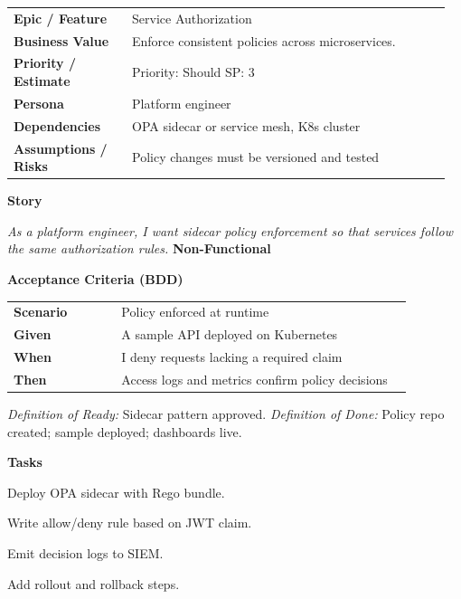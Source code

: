 \documentclass[11pt,letterpaper]{article}
\makeatletter
\newenvironment{kvtable}{%
  \begin{tabular}{@{}>{\bfseries\arraybackslash}p{0.26\linewidth} p{0.70\linewidth}@{}}
}{\end{tabular}}
\newenvironment{bdd}{%
  \begin{tabular}{@{}>{\bfseries\arraybackslash}p{0.26\linewidth} p{0.70\linewidth}@{}}
}{\end{tabular}}
\newcommand{\DoRDoD}[2]{%
  \vspace{0.35em}
  {\footnotesize\color{Muted}%
    \textit{Definition of Ready:} #1 \; \textbullet\;
    \textit{Definition of Done:} #2%
  }%
}
\newenvironment{storycard}[2]{%
  \begin{tcolorbox}[cloudcard, title={#1 --- #2}]%
}{\end{tcolorbox}}
\newcommand{\sectionlabel}[1]{\vspace{0.35em}\textbf{#1}\par}
\makeatother
\begin{document}
\begin{storycard}{CCS-12}{Ch. 12 — Distributed Access Control}
\begin{kvtable}
Epic / Feature & Service Authorization\\
Business Value & Enforce consistent policies across microservices.\\
Priority / Estimate & Priority: Should \quad SP: 3\\
Persona & Platform engineer\\
Dependencies & OPA sidecar or service mesh, K8s cluster\\
Assumptions / Risks & Policy changes must be versioned and tested\\
\end{kvtable}
\sectionlabel{Story}
\textit{As a platform engineer, I want sidecar policy enforcement so that services follow the same authorization rules.}
\sectionlabel{Non-Functional}\;
\sectionlabel{Acceptance Criteria (BDD)}
\begin{bdd}
Scenario & Policy enforced at runtime\\
Given & A sample API deployed on Kubernetes\\
When & I deny requests lacking a required claim\\
Then & Access logs and metrics confirm policy decisions\\
\end{bdd}
\DoRDoD{Sidecar pattern approved.}{Policy repo created; sample deployed; dashboards live.}
\sectionlabel{Tasks}
\begin{checklist}
\item Deploy OPA sidecar with Rego bundle.
\item Write allow/deny rule based on JWT claim.
\item Emit decision logs to SIEM.
\item Add rollout and rollback steps.
\end{checklist}
\end{storycard}
\end{document}
